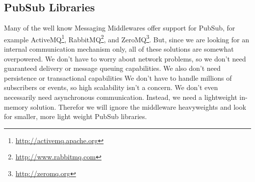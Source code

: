 \subsection{PubSub Libraries}

Many of the well know Messaging Middlewares offer support for PubSub, for example ActiveMQ\footnote{\url{http://activemq.apache.org}}, RabbitMQ\footnote{\url{http://www.rabbitmq.com}}, and ZeroMQ\footnote{\url{http://zeromq.org}}.
But, since we are looking for an internal communication mechanism only, all of these solutions are somewhat overpowered.
We don't have to worry about network problems, so we don't need guaranteed delivery or message queuing capabilities.
We also don't need persistence or transactional capabilities
We don't have to handle millions of subscribers or events, so high scalability isn't a concern.
We don't even necessarily need asynchronous communication.
Instead, we need a lightweight in-memory solution.
Therefor we will ignore the middleware heavyweights and look for smaller, more light weight PubSub libraries.

